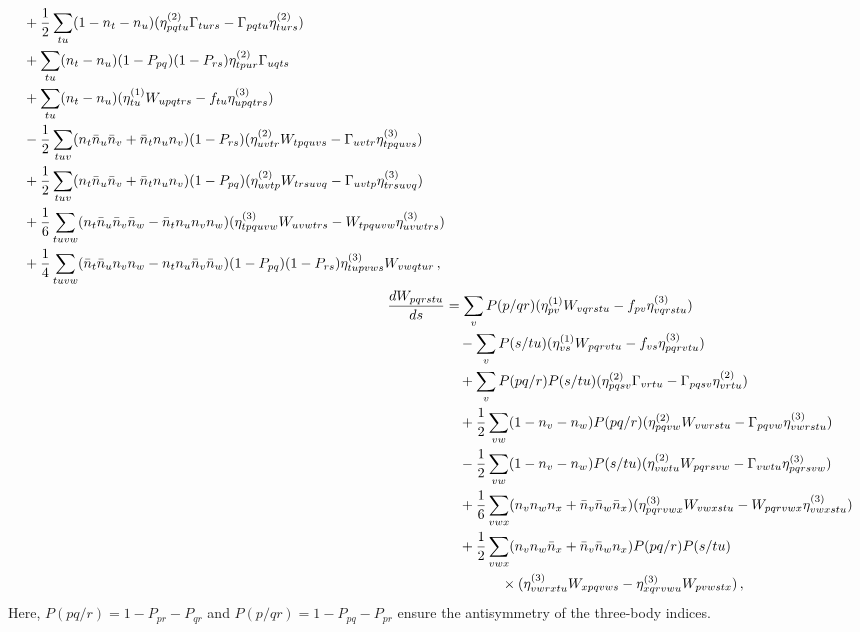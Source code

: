 \begin{align}
\begin{aligned}
    &\quad + \frac{1}{2}\sum_{tu}(1 - n_{t} - n_{u})(\gentwo_{pqtu}\Gamma_{turs} - \Gamma_{pqtu}\gentwo_{turs}) \\
    &\quad + \sum_{tu} (n_t - n_u)(1 - P_{pq})(1 - P_{rs})\gentwo_{tpur}\Gamma_{uqts} \\
    &\quad + \sum_{tu} (n_t - n_u)(\genone_{tu} W_{upqtrs} - f_{tu} \genthree_{upqtrs})\\
    &\quad - \frac{1}{2} \sum_{tuv} (n_t \bar{n}_u \bar{n}_v + \bar{n}_t n_u n_v)
              (1 - P_{rs})(\gentwo_{uvtr} W_{tpquvs} - \Gamma_{uvtr} \genthree_{tpquvs}) \\
    &\quad + \frac{1}{2} \sum_{tuv} (n_t \bar{n}_u \bar{n}_v + \bar{n}_t n_u n_v)
              (1 - P_{pq})(\gentwo_{uvtp} W_{trsuvq} - \Gamma_{uvtp} \genthree_{trsuvq}) \\
    &\quad + \frac{1}{6} \sum_{tuvw}(n_t \bar{n}_u \bar{n}_v \bar{n}_w -\bar{n}_t n_u n_v n_w)
              (\genthree_{tpquvw} W_{uvwtrs} - W_{tpquvw} \genthree_{uvwtrs}) \\
    &\quad + \frac{1}{4} \sum_{tuvw}(\bar{n}_t \bar{n}_u n_v n_w -n_t n_u \bar{n}_v \bar{n}_w)
              (1 - P_{pq})(1 - P_{rs}) \genthree_{tupvws} W_{vwqtur}\,,
  \end{aligned}\label{eq:imsrg3_2body} \\
  &\begin{aligned}
    \mathllap{\frac{dW_{pqrstu}}{ds}} &=
    \sum_{v} P(p/qr) (\genone_{pv} W_{vqrstu} - f_{pv} \genthree_{vqrstu}) \\
    &\quad - \sum_{v} P(s/tu) (\genone_{vs} W_{pqrvtu} - f_{vs} \genthree_{pqrvtu}) \\
    &\quad + \sum_{v} P(pq/r) P(s/tu)
              (\gentwo_{pqsv} \Gamma_{vrtu} - \Gamma_{pqsv} \gentwo_{vrtu}) \\
    &\quad + \frac{1}{2} \sum_{vw} (1 - n_v - n_w) P(pq/r)
              (\gentwo_{pqvw} W_{vwrstu} - \Gamma_{pqvw} \genthree_{vwrstu}) \\
    &\quad - \frac{1}{2} \sum_{vw} (1 - n_v - n_w) P(s/tu)
              (\gentwo_{vwtu} W_{pqrsvw} - \Gamma_{vwtu} \genthree_{pqrsvw}) \\
    &\quad + \frac{1}{6} \sum_{vwx} (n_v n_w n_x + \bar{n}_v \bar{n}_w \bar{n}_x)
              (\genthree_{pqrvwx} W_{vwxstu} - W_{pqrvwx} \genthree_{vwxstu}) \\
    &\quad + \frac{1}{2} \sum_{vwx} (n_v n_w \bar{n}_x + \bar{n}_v \bar{n}_w n_x)
              P(pq/r)P(s/tu)\\
    &\qquad \qquad \times (\genthree_{vwrxtu} W_{xpqvws} -\genthree_{xqrvwu} W_{pvwstx})\,,
  \end{aligned}\label{eq:imsrg3_3body}
\end{align}
Here, $P(pq/r) = 1 - P_{pr} - P_{qr}$ and $P(p/qr) = 1 - P_{pq} - P_{pr}$
ensure the antisymmetry of the three-body indices.

